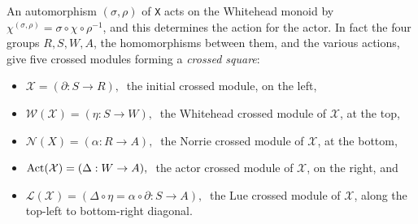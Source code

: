 \documentclass[a4paper,11pt]{report}
\begin{document}
{{{ An automorphism $( \sigma, \rho )$ of \texttt{X} acts on the Whitehead monoid by $\chi^{(\sigma,\rho)} = \sigma \circ \chi \circ \rho^{-1}$, and this determines the action for the actor. In fact the four groups $R, S, W, A$, the homomorphisms between them, and the various actions, give five crossed
modules forming a \emph{crossed square}:  
\begin{itemize}
\item  $\mathcal{X} = (\partial : S \to R),~$ the initial crossed module, on the left, 
\item  $\mathcal{W}(\mathcal{X}) = (\eta : S \to W),~$ the Whitehead crossed module of $\mathcal{X}$, at the top, 
\item  $\mathcal{N}(X) = (\alpha : R \to A),~$ the Norrie crossed module of $\mathcal{X}$, at the bottom, 
\item  $\mathop{\textrm{Act}\rm}(\mathcal{X}) = ( \Delta : W \to A),~$ the actor crossed module of $\mathcal{X}$, on the right, and 
\item  $\mathcal{L}(\mathcal{X}) = (\Delta\circ\eta = \alpha\circ\partial : S \to A),~$ the Lue crossed module of $\mathcal{X}$, along the top-left to bottom-right diagonal. 
\end{itemize}
 }

 

 
\begin{Verbatim}[commandchars=!@|,fontsize=\small,frame=single,label=Example]
  

\end{Verbatim}}}
\end{document}
